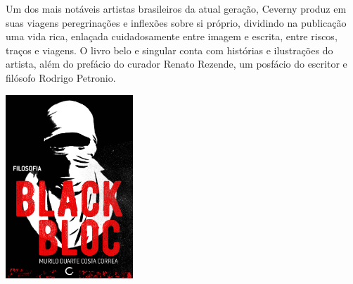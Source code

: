 \medskip

\noindent{}Um dos mais notáveis artistas brasileiros da atual geração, Ceverny produz em suas viagens peregrinações e inflexões sobre si próprio, dividindo na publicação uma vida rica, enlaçada cuidadosamente entre imagem e escrita, entre riscos, traços e viagens. O livro belo e singular conta com histórias e ilustrações do artista, além do prefácio do curador Renato Rezende, um posfácio do escritor e filósofo Rodrigo Petronio.


\vfill

\hspace*{-.4cm}\begin{minipage}[c]{1\linewidth}
\small{
{}}
\end{minipage}

\pagebreak

\hspace{.5cm}

\begin{center}
\hspace*{-2.5cm}
\hspace*{1.8cm}\includegraphics[width=48mm]{./imgs/blackbloc.jpg}
\end{center}

\hspace*{-7cm}\hrulefill\hspace*{-7cm}

